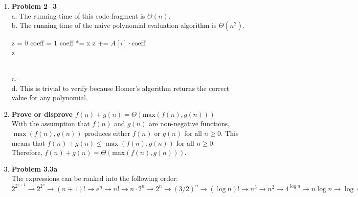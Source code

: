 \documentclass[a4paper,11pt,oneside]{book}
\begin{document}
\begin{enumerate}
  \item {\textbf{Problem 2$-$3}} 
  \\ a. The running time of this code fragment is $\Theta(n)$.
  \\ b. The running time of the naive polynomial evaluation algorithm is $\Theta(n^2)$.
  \begin{algorithm}
    \caption{Naive Polynomial-Evaluation Algorthm Part b}
    \begin{algorithmic}[1]
        \Statex
        \State z = $0$
        \State coeff = $1$
          \State coeff *= x
        \EndFor
        \State z += $A[i] \cdot \text{coeff}$
        \EndFor
        \\
        \Return z
      \EndFunction
    \end{algorithmic}
\end{algorithm} 
  \\ c.
  \\ d. This is trivial to verify because Homer's algorithm returns the correct value for any polynomial.
  
  \item {\textbf{Prove or disprove $f(n) + g(n) = \Theta(\text{max}(f(n), g(n)))$}}
  \\ With the assumption that $f(n)$ and $g(n)$ are non-negative functions, $\max(f(n), g(n))$ produces either 
  $f(n)$ or $g(n)$ for all $n \geq0$. This means that $f(n) + g(n) \leq \max(f(n), g(n))$ for all $n \geq 0$. Therefore, $f(n) + g(n) = \Theta(\text{max}(f(n), g(n)))$.

  \item {\textbf{Problem 3.3a}} 
  \\ The expressions can be ranked into the following order: 
  $
    2^{2^{n+1}} \rightarrow 2^{2^n} \rightarrow (n+1)! \rightarrow e^n \rightarrow n!
    \rightarrow n \cdot 2^n
    \rightarrow 2^n
    \rightarrow (3 / 2)^n
    \rightarrow (\log n) !
    \rightarrow n^3
    \rightarrow n^2 
    \rightarrow 4^{\log n}
    \rightarrow n \log n
    \rightarrow \log (n !)
    \rightarrow n=2^{\log n}
    \rightarrow (\sqrt{2})^{\log n}
    \rightarrow 2^{\sqrt{2 \log n}}
    \rightarrow \log ^2 n
    \rightarrow \ln n
    \rightarrow \ln \ln n 
    \rightarrow \sqrt{\log n}
    \rightarrow 2^{\log n}
    \rightarrow \log { }^* n
    \rightarrow \log ^*(\log n)
  $


\end{enumerate}
\end{document}
